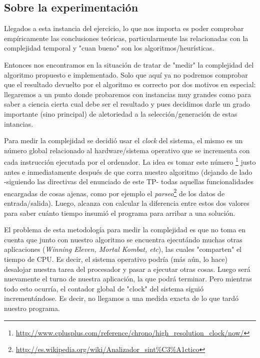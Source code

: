 \subsection*{Sobre la experimentaci\'on}
\par Llegados a esta instancia del ejercicio, lo que nos importa es poder
    comprobar emp\'iricamente las conclusiones te\'oricas, particularmente
    las relacionadas con la complejidad temporal y "cuan bueno" son los
    algoritmos/heur\'isticas.

\par Entonces nos encontramos en la situaci\'on de tratar de "medir"
    la complejidad del algoritmo propuesto e implementado. Solo que aqu\'i ya no podremos
    comprobar que el resultado devuelto por el algoritmo es correcto por dos
    motivos en especial: llegaremos a un punto donde probaremos con instancias
    muy grandes como para saber a ciencia cierta cual debe ser el resultado y
    pues decidimos darle un grado importante (sino principal) de aletoriedad
    a la selecci\'on/generaci\'on de estas intancias.

\par Para medir la complejidad se decidi\'o usar el \emph{clock} del sistema,
    el mismo es un n\'umero global relacionado al hardware/sistema operativo
    que se incrementa con cada instrucci\'on ejecutada por el ordenador. La idea
    es tomar este n\'umero \footnote{%
    \url{http://www.cplusplus.com/reference/chrono/high_resolution_clock/now/}}
    justo antes e inmediatamente despu\'es de que corra nuestro algoritmo
    (dejando de lado -siguiendo las directivas del enunciado de este TP-
    todas aquellas funcionalidades encargadas de cosas ajenas, como
    por ejemplo el \emph{parseo}\footnote{%
    \url{http://es.wikipedia.org/wiki/Analizador_sint\%C3\%A1ctico}} de los datos
    de entrada/salida). Luego, alcanza con calcular la diferencia entre estos dos
    valores para saber cu\'anto tiempo insumi\'o el programa para arribar a una soluci\'on.

\par El problema de esta metodolog\'ia para medir la complejidad es que no
    toma en cuenta que junto con nuestro algoritmo se encuentra ejecut\'ando
    muchas otras aplicaciones (\emph{Winning Eleven, Mortal Kombat, etc}), las
    cuales "comparten" el tiempo de CPU. Es decir, el sistema operativo podr\'ia
    (m\'as a\'un, lo hace) desalojar nuestra tarea del procesador y pasar a
    ejecutar otras cosas. Luego ser\'a nuevamente el turno de nuestra
    aplicaci\'on, la que podr\'a terminar. Pero mientras todo esto ocurr\'ia,
    el contador global de "clock" del sistema sigui\'o increment\'andose. Es
    decir, no llegamos a una medida exacta de lo que tard\'o nuestro programa.

